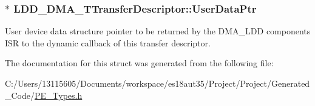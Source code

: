 \subsubsection[{User\+Data\+Ptr}]{$\ast$ L\+D\+D\+\_\+\+D\+M\+A\+\_\+\+T\+Transfer\+Descriptor\+::\+User\+Data\+Ptr}\label{struct_l_d_d___d_m_a___t_transfer_descriptor_a4136d6742944c7b04a94695c78b581b8}
User device data structure pointer to be returned by the D\+M\+A\+\_\+\+L\+D\+D component\textquotesingle{}s I\+S\+R to the dynamic callback of this transfer descriptor. 

The documentation for this struct was generated from the following file\+:\begin{DoxyCompactItemize}
\item 
C\+:/\+Users/13115605/\+Documents/workspace/es18aut35/\+Project/\+Project/\+Generated\+\_\+\+Code/\hyperlink{_p_e___types_8h}{P\+E\+\_\+\+Types.\+h}\end{DoxyCompactItemize}
